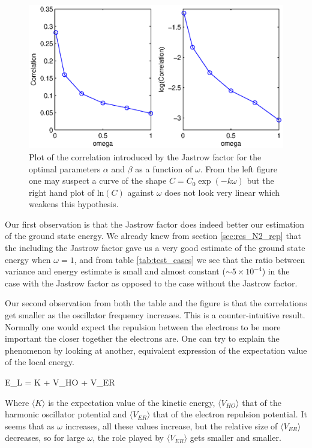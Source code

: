 \begin{figure}[h!]
	\centering 
	\includegraphics[width=\textwidth]{results/correlations_jastrow.eps}
	\caption{Plot of the correlation introduced by the Jastrow factor for the optimal parameters $\alpha$ and $\beta$ as a function of $\omega$. 
	From the left figure one may suspect a curve of the shape $C = C_0 \exp(-k\omega)$ but the right hand plot of $\textrm{ln}(C)$ against $\omega$ does not look very linear which weakens this hypothesis.}
	\label{fig:correlations_jastrow}
\end{figure}

Our first observation is that the Jastrow factor does indeed better our estimation of the ground state energy. 
We already knew from section \ref{sec:res_N2_rep} that the including the Jastrow factor gave us a very good estimate of the ground state energy when $\omega = 1$, and from table \ref{tab:test_cases}  we see that the ratio between variance and energy estimate is small and almost constant ($\sim 5 \times 10^{-4}$) in the case with the Jastrow factor as opposed to the case without the Jastrow factor. 

Our second observation from both the table and the figure is that the correlations get smaller as the oscillator frequency increases. 
This is a counter-intuitive result.
Normally one would expect the repulsion between the electrons to be more important the closer together the electrons are.
One can try to explain the phenomenon by looking at another, equivalent expression of the expectation value of the local energy.

\eqs
\langle E_L \rangle = \langle K \rangle + \langle V_{HO} \rangle + \langle V_{ER} \rangle 
\eqf

Where $\langle K \rangle$ is the expectation value of the kinetic energy, $\langle V_{HO} \rangle$ that of the harmonic oscillator potential and $\langle V_{ER} \rangle$ that of the electron repulsion potential.
It seems that as $\omega$ increases, all these values increase, but the relative size of $\langle V_{ER} \rangle $ decreases, so for large $\omega$, the role played by $\langle V_{ER} \rangle$ gets smaller and smaller.

